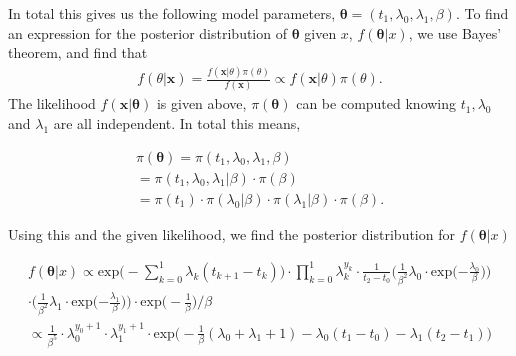 In total this gives us the following model parameters, $\boldsymbol{\theta} = (t_1, \lambda_0, \lambda_1, \beta)$. 
To find an expression for the posterior distribution of $\boldsymbol{\theta}$ given $x$, $f(\boldsymbol{\theta}|x)$, we use Bayes' theorem, and find that 
\begin{align}
    f(\theta|\boldsymbol{x}) = \frac{f(\boldsymbol{x}|\theta) \pi(\theta)}{f(\boldsymbol{x})} \propto f(\boldsymbol{x}|\theta) \pi(\theta) .
\end{align}
The likelihood $f(\boldsymbol{x} | \boldsymbol{\theta})$ is given above, $\pi(\boldsymbol{\theta})$ can be computed knowing $t_1, \lambda_0$ and $\lambda_1$ are all independent. In total this means,

\begin{align}
    \pi(\boldsymbol{\theta}) 
    = \pi(t_1, \lambda_0, \lambda_1, \beta) \nonumber \\
    = \pi(t_1, \lambda_0, \lambda_1 | \beta) \cdot \pi(\beta) \nonumber \\
    = \pi(t_1) \cdot \pi(\lambda_0|\beta) \cdot \pi(\lambda_1|\beta) \cdot \pi(\beta).
\end{align}

Using this and the given likelihood, we find the posterior distribution for $f(\boldsymbol{\theta}|x)$

\begin{align} \label{eq:post}
    f(\boldsymbol{\theta}|x) \propto \text{exp} \Big( - \sum_{k = 0}^1 \lambda_k (t_{k+1} - t_k) \Big)\cdot \prod_{k = 0}^1 \lambda_k^{y_k} \cdot \frac{1}{t_2-t_0} 
    \Big( \frac{1}{\beta^2} \lambda_0 \cdot
    \text{exp} \Big({-\frac{\lambda_0}{\beta}} \Big)  \Big) \nonumber \\ 
    \cdot \Big( \frac{1}{\beta^2} \lambda_1 \cdot \text{exp} \Big({-\frac{\lambda_1}{\beta}} \Big) \Big) \cdot \text{exp} \Big( -\frac{1}{\beta} \Big)/\beta \nonumber \\
    \propto   \frac{1}{\beta^5} \cdot \lambda_0^{y_0 + 1} \cdot \lambda_1^{y_1 + 1} \cdot \text{exp} \Big( -\frac{1}{\beta}(\lambda_0 + \lambda_1 + 1) - \lambda_0(t_1-t_0) - \lambda_1(t_2-t_1) \Big)
\end{align}




